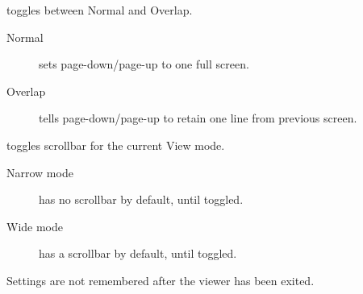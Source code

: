 \begin{description}
{\item[Page mode] toggles between Normal and Overlap.
    \begin{description}
        \item[Normal] sets page{}-down/page{}-up to one full screen.
        \item[Overlap] tells page{}-down/page{}-up to retain one line from previous screen.    
    \end{description}
\item[Scrollbar mode] toggles scrollbar for the current View mode.
    \begin{description}
        \item[Narrow mode] has no scrollbar by default, until toggled.
        \item[Wide mode] has a scrollbar by default, until toggled.
    \end{description}
}
\end{description}
Settings are not remembered after the viewer has been exited.

